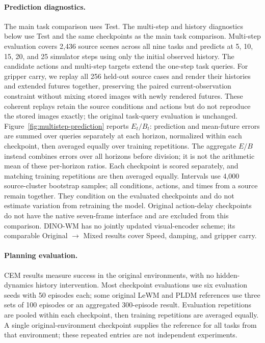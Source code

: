 \paragraph{Prediction diagnostics.}
The main task comparison uses Test.
The multi-step and history diagnostics below use Test and the same checkpoints as the main task comparison.
Multi-step evaluation covers 2,436 source scenes across all nine tasks and predicts at 5, 10, 15, 20, and 25 simulator steps using only the initial observed history.
The candidate actions and multi-step targets extend the one-step task queries.
For gripper carry, we replay all 256 held-out source cases and render their histories and extended futures together, preserving the paired current-observation constraint without mixing stored images with newly rendered futures. These coherent replays retain the source conditions and actions but do not reproduce the stored images exactly; the original task-query evaluation is unchanged.
Figure~\ref{fig:multistep-prediction} reports $E_t/B_t$: prediction and mean-future errors are summed over queries separately at each horizon, normalized within each checkpoint, then averaged equally over training repetitions. The aggregate $E/B$ instead combines errors over all horizons before division; it is not the arithmetic mean of these per-horizon ratios.
Each checkpoint is scored separately, and matching training repetitions are then averaged equally.
Intervals use 4,000 source-cluster bootstrap samples; all conditions, actions, and times from a source remain together.
They condition on the evaluated checkpoints and do not estimate variation from retraining the model.
Original action-delay checkpoints do not have the native seven-frame interface and are excluded from this comparison.
DINO-WM has no jointly updated visual-encoder scheme; its comparable Original $\rightarrow$ Mixed results cover Speed, damping, and gripper carry.

\paragraph{Planning evaluation.}
CEM results measure success in the original environments, with no hidden-dynamics history intervention.
Most checkpoint evaluations use six evaluation seeds with 50 episodes each; some original LeWM and PLDM references use three sets of 100 episodes or an aggregated 300-episode result.
Evaluation repetitions are pooled within each checkpoint, then training repetitions are averaged equally.
A single original-environment checkpoint supplies the reference for all tasks from that environment; these repeated entries are not independent experiments.

